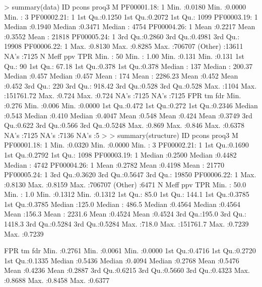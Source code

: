 \documentclass[a4,center,fleqn]{NAR}
\begin{document}
> summary(data)
          ID            pcons            proq3              M
 PF00001.18:    1   Min.   :0.0180   Min.   :0.0000   Min.   :     3
 PF00002.21:    1   1st Qu.:0.1250   1st Qu.:0.2072   1st Qu.:  1099
 PF00003.19:    1   Median :0.1940   Median :0.3471   Median :  4754
 PF00004.26:    1   Mean   :0.2217   Mean   :0.3552   Mean   : 21818
 PF00005.24:    1   3rd Qu.:0.2860   3rd Qu.:0.4981   3rd Qu.: 19908
 PF00006.22:    1   Max.   :0.8130   Max.   :0.8285   Max.   :706707
 (Other)   :13611                                     NA's   :7125
       N             Meff                ppv             TPR
 Min.   :  50   Min.   :     1.00   Min.   :0.131   Min.   :0.131
 1st Qu.:  90   1st Qu.:    67.18   1st Qu.:0.378   1st Qu.:0.378
 Median : 137   Median :   200.37   Median :0.457   Median :0.457
 Mean   : 174   Mean   :  2286.23   Mean   :0.452   Mean   :0.452
 3rd Qu.: 220   3rd Qu.:   918.42   3rd Qu.:0.528   3rd Qu.:0.528
 Max.   :1104   Max.   :151761.72   Max.   :0.724   Max.   :0.724
                                    NA's   :7125    NA's   :7125
      FPR              tm             fdr
 Min.   :0.276   Min.   :0.006   Min.   :0.0000
 1st Qu.:0.472   1st Qu.:0.272   1st Qu.:0.2346
 Median :0.543   Median :0.410   Median :0.4047
 Mean   :0.548   Mean   :0.424   Mean   :0.3749
 3rd Qu.:0.622   3rd Qu.:0.566   3rd Qu.:0.5248
 Max.   :0.869   Max.   :0.846   Max.   :0.6378
 NA's   :7125    NA's   :7136    NA's   :5
>
> summary(structure)
          ID           pcons            proq3              M
 PF00001.18:   1   Min.   :0.0320   Min.   :0.0000   Min.   :     3
 PF00002.21:   1   1st Qu.:0.1690   1st Qu.:0.2792   1st Qu.:  1098
 PF00003.19:   1   Median :0.2500   Median :0.4482   Median :  4742
 PF00004.26:   1   Mean   :0.2782   Mean   :0.4198   Mean   : 21770
 PF00005.24:   1   3rd Qu.:0.3620   3rd Qu.:0.5647   3rd Qu.: 19850
 PF00006.22:   1   Max.   :0.8130   Max.   :0.8159   Max.   :706707
 (Other)   :6471
       N              Meff               ppv              TPR
 Min.   : 50.0   Min.   :     1.0   Min.   :0.1312   Min.   :0.1312
 1st Qu.: 85.0   1st Qu.:   144.1   1st Qu.:0.3785   1st Qu.:0.3785
 Median :125.0   Median :   486.5   Median :0.4564   Median :0.4564
 Mean   :156.3   Mean   :  2231.6   Mean   :0.4524   Mean   :0.4524
 3rd Qu.:195.0   3rd Qu.:  1418.3   3rd Qu.:0.5284   3rd Qu.:0.5284
 Max.   :718.0   Max.   :151761.7   Max.   :0.7239   Max.   :0.7239

      FPR               tm              fdr
 Min.   :0.2761   Min.   :0.0061   Min.   :0.0000
 1st Qu.:0.4716   1st Qu.:0.2720   1st Qu.:0.1335
 Median :0.5436   Median :0.4094   Median :0.2768
 Mean   :0.5476   Mean   :0.4236   Mean   :0.2887
 3rd Qu.:0.6215   3rd Qu.:0.5660   3rd Qu.:0.4323
 Max.   :0.8688   Max.   :0.8458   Max.   :0.6377
\end{document}
